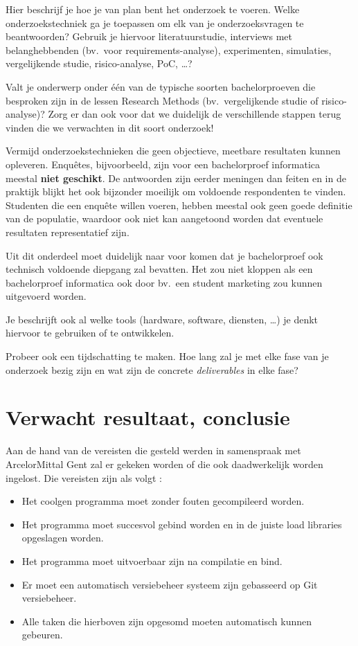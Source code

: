 Hier beschrijf je hoe je van plan bent het onderzoek te voeren. Welke onderzoekstechniek ga je toepassen om elk van je onderzoeksvragen te beantwoorden? Gebruik je hiervoor literatuurstudie, interviews met belanghebbenden (bv.~voor requirements-analyse), experimenten, simulaties, vergelijkende studie, risico-analyse, PoC, \ldots?

Valt je onderwerp onder één van de typische soorten bachelorproeven die besproken zijn in de lessen Research Methods (bv.\ vergelijkende studie of risico-analyse)? Zorg er dan ook voor dat we duidelijk de verschillende stappen terug vinden die we verwachten in dit soort onderzoek!

Vermijd onderzoekstechnieken die geen objectieve, meetbare resultaten kunnen opleveren. Enquêtes, bijvoorbeeld, zijn voor een bachelorproef informatica meestal \textbf{niet geschikt}. De antwoorden zijn eerder meningen dan feiten en in de praktijk blijkt het ook bijzonder moeilijk om voldoende respondenten te vinden. Studenten die een enquête willen voeren, hebben meestal ook geen goede definitie van de populatie, waardoor ook niet kan aangetoond worden dat eventuele resultaten representatief zijn.

Uit dit onderdeel moet duidelijk naar voor komen dat je bachelorproef ook technisch voldoen\-de diepgang zal bevatten. Het zou niet kloppen als een bachelorproef informatica ook door bv.\ een student marketing zou kunnen uitgevoerd worden.

Je beschrijft ook al welke tools (hardware, software, diensten, \ldots) je denkt hiervoor te gebruiken of te ontwikkelen.

Probeer ook een tijdschatting te maken. Hoe lang zal je met elke fase van je onderzoek bezig zijn en wat zijn de concrete \emph{deliverables} in elke fase?

\section{Verwacht resultaat, conclusie}%
\label{sec:verwachte_resultaten}

Aan de hand van de vereisten die gesteld werden in samenspraak met ArcelorMittal Gent zal er gekeken worden of die ook daadwerkelijk worden ingelost. 
Die vereisten zijn als volgt :
\begin{itemize}
  \item Het coolgen programma moet zonder fouten gecompileerd worden.
  \item Het programma moet succesvol gebind worden en in de juiste load libraries opgeslagen worden. 
  \item Het programma moet uitvoerbaar zijn na compilatie en bind.
  \item Er moet een automatisch versiebeheer systeem zijn gebasseerd op Git versiebeheer.
  \item Alle taken die hierboven zijn opgesomd moeten automatisch kunnen gebeuren.
\end{itemize}

